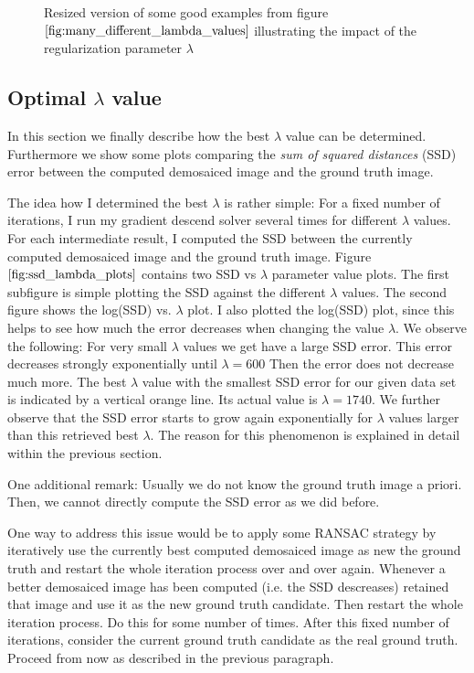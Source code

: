 \documentclass{paper}
\begin{document}
\begin{figure}[h!]
\begin{center}
\end{center}

\caption{Resized version of some good examples from figure $\ref{fig:many_different_lambda_values}$ illustrating the impact of the regularization parameter $\lambda$}
\label{fig:three_different_lambda_values}
\end{figure}

 
\subsection{Optimal $\lambda$ value}

In this section we finally describe how the best $\lambda$ value can be determined. Furthermore we show some plots comparing the \emph{sum of squared distances} (SSD) error between the computed demosaiced image and the ground truth image. 

The idea how I determined the best $\lambda$ is rather simple: For a fixed number of iterations, I run my gradient descend solver several times for different $\lambda$ values. For each intermediate result, I computed the SSD between the currently computed demosaiced image and the ground truth image. Figure $\ref{fig:ssd_lambda_plots}$ contains two SSD vs $\lambda$ parameter value plots. The first subfigure is simple plotting the SSD against the different $\lambda$ values. The second figure shows the log(SSD) vs. $\lambda$ plot. I also plotted the log(SSD) plot, since this helps to see how much the error decreases when changing the value $\lambda$. We observe the following: For very small $\lambda$ values we get have a large SSD error. This error decreases strongly exponentially until $\lambda=600$ Then the error does not decrease much more. The best $\lambda$ value with the smallest SSD error for our given data set is indicated by a vertical orange line. Its actual value is $\lambda=1740$. We further observe that the SSD error starts to grow again exponentially for $\lambda$ values larger than this retrieved best $\lambda$. The reason for this phenomenon is explained in detail within the previous section.   


One additional remark: Usually we do not know the ground truth image a priori. Then, we cannot directly compute the SSD error as we did before. 

One way to address this issue would be to apply some RANSAC strategy by iteratively use the currently best computed demosaiced image as new the ground truth and restart the whole iteration process over and over again. Whenever a better demosaiced image has been computed (i.e. the SSD descreases) retained that image and use it as the new ground truth candidate. Then restart the whole iteration process. Do this for some number of times. After this fixed number of iterations, consider the current ground truth candidate as the real ground truth. Proceed from now as described in the previous paragraph.     
\end{document}
